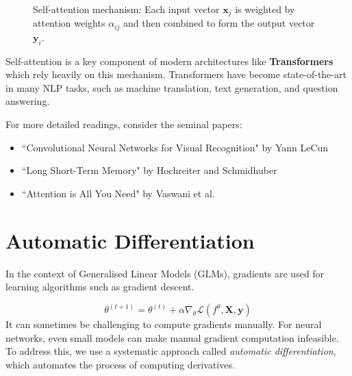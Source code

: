 \begin{figure}[h]
    \caption{Self-attention mechanism: Each input vector \( \bm{x}_j \) is weighted by attention weights \( \alpha_{ij} \) and then combined to form the output vector \( \bm{y}_i \).}
    \label{fig:attention}
\end{figure}


Self-attention is a key component of modern architectures like \textbf{Transformers} which rely heavily on this mechanism. Transformers have become state-of-the-art in many NLP tasks, such as machine translation, text generation, and question answering.


For more detailed readings, consider the seminal papers:
\begin{itemize}
    \item ``Convolutional Neural Networks for Visual Recognition" by Yann LeCun
    \item ``Long Short-Term Memory" by Hochreiter and Schmidhuber
    \item ``Attention is All You Need" by Vaswani et al.
\end{itemize}

\section{Automatic Differentiation}

In the context of Generalised Linear Models (GLMs), gradients are used for learning algorithms such as gradient descent.

\[\theta^{(t+1)}=\theta^{(t)}+\alpha\nabla_\theta\mathcal{L}(f^\theta,\bm{X},\bm{y})
\]
It can sometimes be challenging to compute gradients manually. For neural networks, even small models can make manual gradient computation infeasible. To address this, we use a systematic approach called \textit{automatic differentiation}, which automates the process of computing derivatives.

